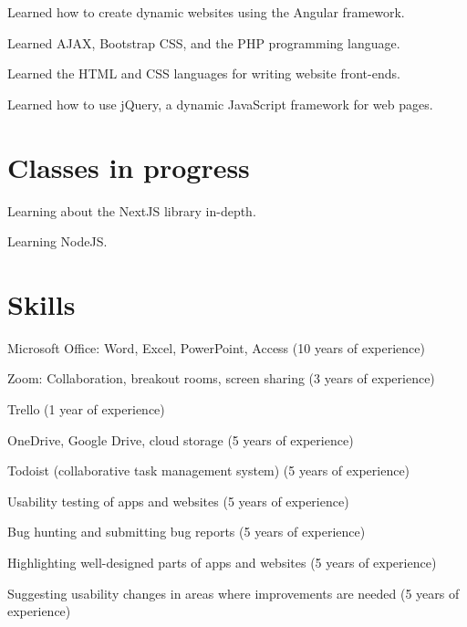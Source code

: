\documentclass[]{deedy-resume-openfont}
\begin{document}
Learned how to create dynamic websites using the Angular framework.
\sectionsep

Learned AJAX, Bootstrap CSS, and the PHP programming language.
\sectionsep

Learned the HTML and CSS languages for writing website front-ends.
\sectionsep

Learned how to use jQuery, a dynamic JavaScript framework for web pages.
\sectionsep

\section{Classes in progress}
Learning about the NextJS library in-depth.
\sectionsep

Learning NodeJS.
\sectionsep

\section{Skills}
\descript{}
\begin{tightemize}
\item Microsoft Office: Word\footnotemark, Excel\footnotemark[\value{footnote}], PowerPoint, Access (10 years of experience)
\item Zoom: Collaboration, breakout rooms, screen sharing (3 years of experience)
\item Trello (1 year of experience)
\item OneDrive, Google Drive, cloud storage (5 years of experience)
\item Todoist (collaborative task management system) (5 years of experience)
\end{tightemize}
\sectionsep

\descript{}
\begin{tightemize}
\item Usability testing of apps and websites (5 years of experience)
\item Bug hunting and submitting bug reports (5 years of experience)
\item Highlighting well-designed parts of apps and websites (5 years of experience)
\item Suggesting usability changes in areas where improvements are needed (5 years of experience)
\end{tightemize}
\sectionsep
\end{document}
